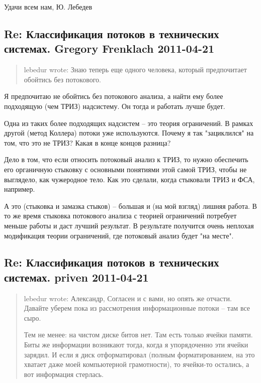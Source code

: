 \documentclass[a4paper,11pt]{article}
\begin{document}
Удачи всем нам, Ю. Лебедев

\subsection*{Re: Классификация потоков в технических системах.  Gregory
  Frenklach 2011-04-21}

\begin{quote}
  lebedur wrote: Знаю теперь еще одного человека, который предпочитает
  обойтись без потокового.
\end{quote}
Я предпочитаю не обойтись без потокового анализа, а найти ему более подходящую
(чем ТРИЗ) надсистему.  Он тогда и работать лучше будет.

Одна из таких более подходящих надсистем -- это теория ограничений.  В рамках
другой (метод Коллера) потоки уже используются.  Почему я так "зациклился" на
том, что это не ТРИЗ?  Какая в конце концов разница?

Дело в том, что если относить потоковый анализ к ТРИЗ, то нужно обеспечить его
органичную стыковку с основными понятиями этой самой ТРИЗ, чтобы не выглядело,
как чужеродное тело.  Как это сделали, когда стыковали ТРИЗ и ФСА, например.

А это (стыковка и замазка стыков) -- большая и (на мой взгляд) лишняя работа.
В то же время стыковка потокового анализа с теорией ограничений потребует
меньше работы и даст лучший результат. В результате получится очень неплохая
модификация теории ограничений, где потоковый анализ будет "на месте".

\subsection*{Re: Классификация потоков в технических системах. priven
  2011-04-21} 

\begin{quote}
  lebedur wrote: Александр, Согласен и с вами, но опять же отчасти. Давайте
  уберем пока из рассмотрения информационные потоки – там все сыро.
  
  Тем не менее: на чистом диске битов нет. Там есть только ячейки памяти. Биты
  же информации возникают тогда, когда я упорядоченно эти ячейки зарядил. И
  если я диск отформатировал (полным форматированием, на это хватает даже моей
  компьютерной грамотности), то ячейки-то остались, а вот информация стерлась.
\end{quote}
\end{document}
